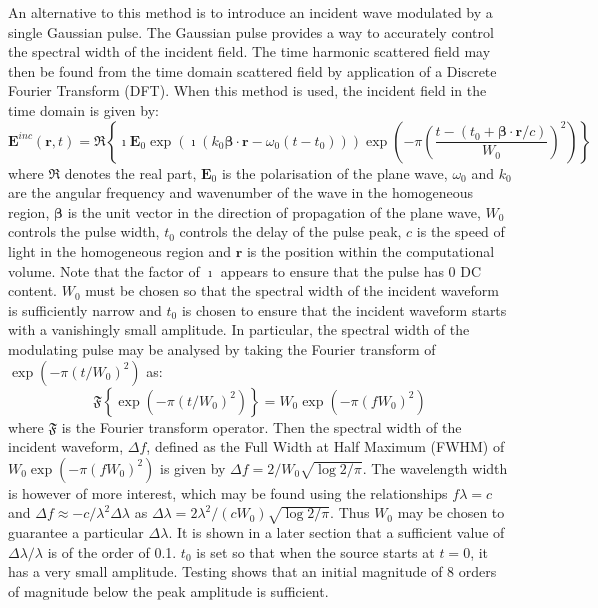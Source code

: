 \documentclass[a4paper, 12pt]{article}
\begin{document}
	An alternative to this method is to introduce an incident wave
	modulated by a single Gaussian pulse. The Gaussian pulse provides a
	way to accurately control the spectral width of the incident field. The time harmonic scattered field may then be found from the time
	domain scattered field by application of a Discrete Fourier Transform
	(DFT). When this method is used, the incident field in the time domain is
	given by:
	\begin{equation}
		\label{eq:fdtd:tdinc}
		\mathbf{E}^{inc}(\mathbf{r},t)=\Re\left\{\imath\mathbf{E}_0\exp(\imath(k_0\boldsymbol{\beta}\!\cdot\!\mathbf{r}-\omega_0(t-t_0)))\exp\left(-\pi\left(\frac{t-(t_0+\boldsymbol{\beta}\!\cdot\!\mathbf{r}/c)}{W_0}\right)^2\right)\right\}
	\end{equation}
	where $\Re$ denotes the real part, $\mathbf{E}_0$ is the
	polarisation of the plane wave,
	$\omega_0$ and $k_0$ are the angular frequency and wavenumber of the
	wave in the homogeneous region, $\boldsymbol{\beta}$ is the unit vector in the
	direction of propagation of the plane wave, $W_0$
	controls the pulse width, $t_0$ controls the delay of the pulse
	peak, $c$ is the speed of light in the homogeneous region and $\mathbf{r}$ is the position within the computational volume. Note that the factor of $\imath$ appears to ensure that the
	pulse has 0 DC content. $W_0$
	must be chosen so that the spectral width of the incident waveform is
	sufficiently narrow and $t_0$ is chosen to ensure that the incident
	waveform starts with a vanishingly small amplitude. In particular, the
	spectral width of the modulating pulse may be analysed by taking the
	Fourier transform of $\exp(-\pi(t/W_0)^2)$ as:
	\begin{equation}
		\label{eq:fdtd:specwid}
		\mathfrak{F}\left\{\exp(-\pi(t/W_0)^2)\right\}=W_0\exp(-\pi(fW_0)^2)
	\end{equation}
	where $\mathfrak{F}$ is the Fourier transform operator. Then the
	spectral width of the incident waveform, $\Delta f$, defined as the
	Full Width at Half Maximum (FWHM) of $W_0\exp(-\pi(fW_0)^2)$ is given
	by $\Delta f=2/W_0\sqrt{\log 2/\pi}$. The wavelength width is however
	of more interest, which may be found using the relationships
	$f\lambda=c$ and $\Delta f\approx -c/\lambda^2\Delta \lambda$ as
	$\Delta \lambda=2\lambda^2/(c W_0)\sqrt{\log 2/\pi}$. Thus $W_0$ may
	be chosen to guarantee a particular $\Delta \lambda$. It is shown in a
	later section that a sufficient value of $\Delta \lambda/\lambda$ is
	of the order of 0.1. $t_0$ is set so that when the source starts at $t=0$,
	it has a very small amplitude. Testing shows that an initial
	magnitude of 8 orders of magnitude below the peak amplitude is
	sufficient. 
	
\end{document}
